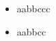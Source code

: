 \documentclass{article}
\begin{document}
\begin{enumerate}
{\begin{enumerate}
{        	\begin{itemize}
        		\item {
        		aabbccc\\
        		
        		
        		}
        		\item {
        		aabbcc\\
        		
        		}
        	\end{itemize}
        		
        	}
        
        \end{enumerate}
    	}
    \end{enumerate}
\end{document}
